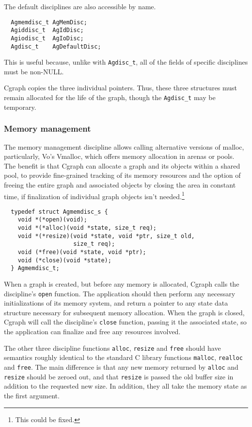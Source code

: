 \documentclass[11pt,letterpaper]{article}
\begin{document}
The default disciplines are also accessible by name.
\begin{verbatim}
  Agmemdisc_t AgMemDisc;
  Agiddisc_t  AgIdDisc;
  Agiodisc_t  AgIoDisc;
  Agdisc_t    AgDefaultDisc;
\end{verbatim}
This is useful because, unlike with \verb"Agdisc_t", all of the fields of
specific disciplines must be non-NULL.

Cgraph copies the three individual pointers. Thus, these three structures must remain
allocated for the life of the graph, though the \verb"Agdisc_t" may be temporary.

\subsubsection{Memory management}
The memory management discipline allows calling alternative versions
of malloc, particularly, Vo's Vmalloc, which offers memory allocation
in arenas or pools.  The benefit is that Cgraph can allocate a graph
and its objects within a shared pool,
to provide fine-grained tracking of its memory resources
and the option of freeing the entire graph and associated objects
by closing the area in constant time, if finalization of individual
graph objects isn't needed.\footnote{This could be fixed.}


\begin{verbatim}
  typedef struct Agmemdisc_s {
    void *(*open)(void);
    void *(*alloc)(void *state, size_t req);
    void *(*resize)(void *state, void *ptr, size_t old, 
                    size_t req);
    void (*free)(void *state, void *ptr);
    void (*close)(void *state);
  } Agmemdisc_t;
\end{verbatim}

When a graph is created, but before any memory is allocated, Cgraph calls the 
discipline's \verb"open" function. The application should then perform any necessary
initializations of its memory system, and return a pointer to any state data structure
necessary for subsequent memory allocation. When the graph is closed, Cgraph will 
call the discipline's \verb"close" function, passing it the associated state, so the application
can finalize and free any resources involved.

The other three discipline functions \verb"alloc", \verb"resize" and \verb"free" should have semantics
roughly identical to the standard C library functions \verb"malloc", \verb"realloc" and \verb"free".
The main difference is that any new memory returned by \verb"alloc" and \verb"resize" should be zeroed out,
and that \verb"resize" is passed the old buffer size in addition to the requested new size. In addition,
they all take the memory state as the first argument.
\end{document}

